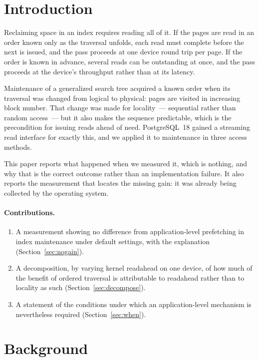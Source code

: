 \section{Introduction}

Reclaiming space in an index requires reading all of it. If the pages are read in
an order known only as the traversal unfolds, each read must complete before the
next is issued, and the pass proceeds at one device round trip per page. If the
order is known in advance, several reads can be outstanding at once, and the pass
proceeds at the device's throughput rather than at its latency.

Maintenance of a generalized search tree acquired a known order when its
traversal was changed from logical to physical: pages are visited in increasing
block number. That change was made for locality~--- sequential rather than random
access~--- but it also makes the sequence predictable, which is the precondition
for issuing reads ahead of need. PostgreSQL~18 gained a streaming read interface
for exactly this, and we applied it to maintenance in three access methods.

This paper reports what happened when we measured it, which is nothing, and why
that is the correct outcome rather than an implementation failure. It also
reports the measurement that locates the missing gain: it was already being
collected by the operating system.

\paragraph{Contributions.}

\begin{enumerate}
\item A measurement showing no difference from application-level prefetching in
      index maintenance under default settings, with the explanation
      (Section~\ref{sec:nogain}).
\item A decomposition, by varying kernel readahead on one device, of how much of
      the benefit of ordered traversal is attributable to readahead rather than
      to locality as such (Section~\ref{sec:decompose}).
\item A statement of the conditions under which an application-level mechanism
      is nevertheless required (Section~\ref{sec:when}).
\end{enumerate}

\section{Background}

